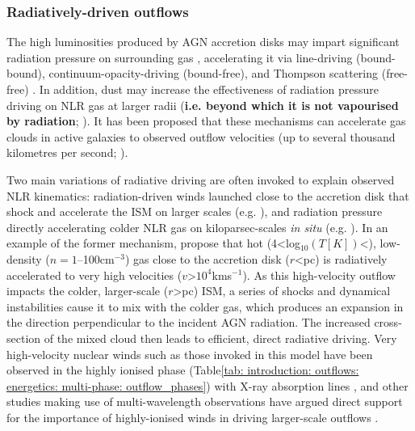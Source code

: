 \subsubsection{Radiatively-driven outflows}
\label{section: introduction: outflows: accleration_mechanisms: radiation}

The high luminosities produced by AGN accretion disks may impart significant radiation pressure on surrounding gas \citep{Castor1975, Abbott1982}, accelerating it via line-driving (bound-bound), continuum-opacity-driving (bound-free), and Thompson scattering (free-free) \citep{Arav1994, Murray1995, Proga1998, Proga2000}. In addition, dust may increase the effectiveness of radiation pressure driving on NLR gas at larger radii (\textbf{i.e. beyond which it is not vapourised by radiation}; \citealt{Dopita2002, Fabian2006}). It has been proposed that these mechanisms can accelerate gas clouds in active galaxies to observed outflow velocities (up to several thousand kilometres per second; \citealt{Crenshaw2000_N1068, Crenshaw2000_N4151, King2003, Das2005, Das2006, Hopkins2010, King2010, MullerSanchez2011, Meena2021}). 

Two main variations of radiative driving are often invoked to explain observed NLR kinematics: radiation-driven winds launched close to the accretion disk that shock and accelerate the ISM on larger scales (e.g. \citealt{Elvis2000, Proga2000, King2003}), and radiation pressure directly accelerating colder NLR gas on kiloparsec-scales \textit{in situ} (e.g. \citealt{Das2007, Fischer2017, Revalski2018, Meena2021, Meena2023}). In an example of the former mechanism, \citet{Hopkins2010} propose that hot (4\;\textless\;log$_{10}(T [K])$\;\textless{}), low-density ($n=1$--100\;cm$^{-3}$) gas close to the accretion disk ($r$\;\textless{}\;pc) is radiatively accelerated to very high velocities ($v$\;\textgreater\;$10^4$\;km\;s\;$^{-1}$). As this high-velocity outflow impacts the colder, larger-scale ($r$\;\textgreater{}\;pc) ISM, a series of shocks and dynamical instabilities cause it to mix with the colder gas, which produces an expansion in the direction perpendicular to the incident AGN radiation. The increased cross-section of the mixed cloud then leads to efficient, direct radiative driving. Very high-velocity nuclear winds such as those invoked in this model have been observed in the highly ionised phase (Table\;\ref{tab: introduction: outflows: energetics: multi-phase: outflow_phases}) with X-ray absorption lines \citep{Pounds2004, Lobban2011, Pounds2011, Tombesi2011}, and other studies making use of multi-wavelength observations have argued direct support for the importance of highly-ionised winds in driving larger-scale outflows \citep{Pounds2013, Feruglio2015}.

